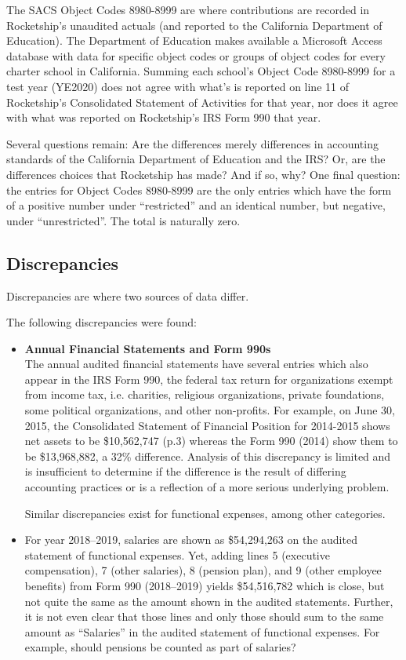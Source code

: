 \begin{itemize}
  The SACS Object Codes 8980-8999 are where contributions are recorded in Rocketship's unaudited actuals (and reported to the California Department of Education). The Department of Education makes available a Microsoft Access database with data for specific object codes or groups of object codes for every charter school in California. Summing each school's Object Code 8980-8999 for a test year (YE2020) does not agree with what's is reported on line 11 of Rocketship's Consolidated Statement of Activities for that year, nor does it agree with what was reported on Rocketship's IRS Form 990 that year.

  Several questions remain: Are the differences merely differences in accounting standards of the California Department of Education and the IRS? Or, are the differences choices that Rocketship has made? And if so, why? One final question: the entries for Object Codes 8980-8999 are the only entries which have the form of a positive number under ``restricted'' and an identical number, but negative, under ``unrestricted''. The total is naturally zero.
\end{itemize}

\subsection{Discrepancies}
\label{sec:discrepancies}\indent%

Discrepancies are where two sources of data differ.

The following discrepancies were found:
\begin{itemize}
  \item \textbf{Annual Financial Statements and Form 990s}\\
  The annual audited financial statements have several entries which also appear in the IRS Form 990, the federal tax return for organizations exempt from income tax, i.e. charities, religious organizations, private foundations, some political organizations, and other non-profits. For example, on June 30, 2015, the Consolidated Statement of Financial Position for 2014-2015 shows net assets to be \$10,562,747 (p.3) whereas the Form 990 (2014) show them to be \$13,968,882, a 32\% difference. Analysis of this discrepancy is limited and is insufficient to determine if the difference is the result of differing accounting practices or is a reflection of a more serious underlying problem.

  Similar discrepancies exist for functional expenses, among other categories.
  \item For year 2018–2019, salaries are shown as \$54,294,263 on the audited statement of functional expenses. Yet, adding lines 5 (executive compensation), 7 (other salaries), 8 (pension plan), and 9 (other employee benefits) from Form 990 (2018–2019) yields \$54,516,782 which is close, but not quite the same as the amount shown in the audited statements. Further, it is not even clear that those lines and only those should sum to the same amount as ``Salaries'' in the audited statement of functional expenses.  For example, should pensions be counted as part of salaries? 
\end{itemize}


